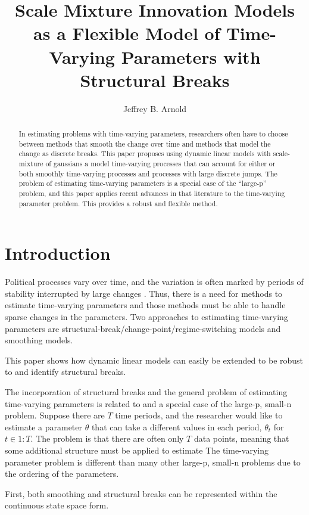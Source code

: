 \documentclass{article}
\author{Jeffrey B. Arnold}
\title{Scale Mixture Innovation Models as a Flexible Model of Time-Varying Parameters with Structural Breaks}
\begin{document}
\maketitle{}

\begin{abstract}
  In estimating problems with time-varying parameters, researchers often have to choose between methods that smooth the change over time and methods that model the change as discrete breaks.
  This paper proposes using dynamic linear models with scale-mixture of gaussians a model time-varying processes that can account for either or both smoothly time-varying processes and processes with large discrete jumps.
  The problem of estimating time-varying parameters is a special case of the ``large-p'' problem, and this paper applies recent advances in that literature to the time-varying parameter problem.
  This provides a robust and flexible method. 
\end{abstract}

\section{Introduction}
\label{sec:introduction}

Political processes vary over time, and the variation is often marked by periods of stability interrupted by large changes \parencite{RatkovicEng2010}.
Thus, there is a need for methods to estimate time-varying parameters and those methods must be able to handle sparse changes in the parameters.
Two approaches to estimating time-varying parameters are structural-break/change-point/regime-switching models and smoothing models.


This paper shows how dynamic linear models can easily be extended to be robust to and identify structural breaks.

The incorporation of structural breaks and the general problem of estimating time-varying parameters is related to and a special case of the large-p, small-n problem.
Suppose there are $T$ time periods, and the researcher would like to estimate a parameter $\theta$ that can take a different values in each period, $\theta_{t}$ for $t \in 1:T$.
The problem is that there are often only $T$ data points, meaning that some additional structure must be applied to estimate 
The time-varying parameter problem is different than many other large-p, small-n problems due to the ordering of the parameters.

First, both smoothing and structural breaks can be represented within the continuous state space form. 
\end{document}
